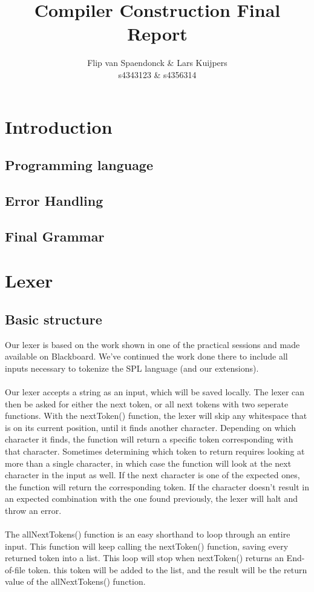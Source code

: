 \documentclass[10pt,a4paper]{article}
\author{Flip van Spaendonck \& Lars Kuijpers \\ s4343123 \& s4356314}
\title{Compiler Construction Final Report}
\begin{document}
\maketitle
\tableofcontents

\section{Introduction}
\subsection{Programming language}
\subsection{Error Handling}
\subsection{Final Grammar}


\section{Lexer}
\subsection{Basic structure}
Our lexer is based on the work shown in one of the practical sessions and made available on Blackboard. We've continued the work done there to include all inputs necessary to tokenize the SPL language (and our extensions). \\
\\
Our lexer accepts a string as an input, which will be saved locally. The lexer can then be asked for either the next token, or all next tokens with two seperate functions. With the nextToken() function, the lexer will skip any whitespace that is on its current position, until it finds another character. Depending on which character it finds, the function will return a specific token corresponding with that character. Sometimes determining which token to return requires looking at more than a single character, in which case the function will look at the next character in the input as well. If the next character is one of the expected ones, the function will return the corresponding token. If the character doesn't result in an expected combination with the one found previously, the lexer will halt and throw an error.\\
\\
The allNextTokens() function is an easy shorthand to loop through an entire input. This function will keep calling the nextToken() function, saving every returned token into a list. This loop will stop when nextToken() returns an End-of-file token. this token will be added to the list, and the result will be the return value of the allNextTokens() function.
\end{document}
